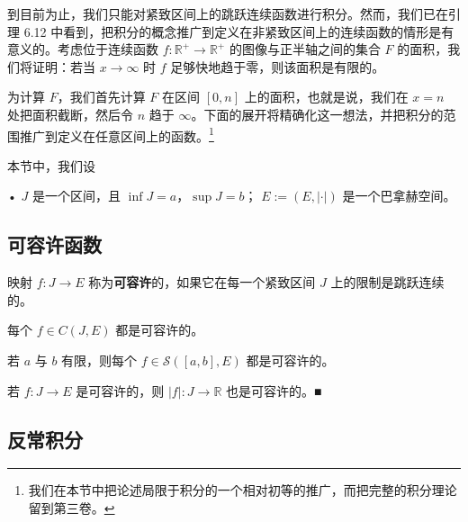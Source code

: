 到目前为止，我们只能对紧致区间上的跳跃连续函数进行积分。然而，我们已在引理 6.12 中看到，把积分的概念推广到定义在非紧致区间上的连续函数的情形是有意义的。考虑位于连续函数 $ f : \mathbb{R}^{+} \to \mathbb{R}^{+} $ 的图像与正半轴之间的集合 $ F $ 的面积，我们将证明：若当 $ x \to \infty $ 时 $ f $ 足够快地趋于零，则该面积是有限的。

为计算 $ F $，我们首先计算 $ F $ 在区间 $ [0, n] $ 上的面积，也就是说，我们在 $ x = n $ 处把面积截断，然后令 $ n $ 趋于 $ \infty $。下面的展开将精确化这一想法，并把积分的范围推广到定义在任意区间上的函数。\footnote{我们在本节中把论述局限于积分的一个相对初等的推广，而把完整的积分理论留到第三卷。}


本节中，我们设

• $ J $ 是一个区间，且 $ \inf J = a $，$ \sup J = b $；
  $ E := (E, \left| \cdot \right|) $ 是一个巴拿赫空间。

\subsection*{可容许函数}

映射 $ f : J \to E $ 称为\textbf{可容许}的，如果它在每一个紧致区间 $ J $ 上的限制是跳跃连续的。

\begin{example}

\begin{items}
\item

每个 $ f \in C(J, E) $ 都是可容许的。

\item

若 $ a $ 与 $ b $ 有限，则每个 $ f \in \mathcal{S}([a, b], E) $ 都是可容许的。

\item

若 $ f : J \to E $ 是可容许的，则 $ \left| f \right| : J \to \mathbb{R} $ 也是可容许的。\nobreak\hspace{0.35em}■

\end{items}

\end{example}

\subsection*{反常积分}

